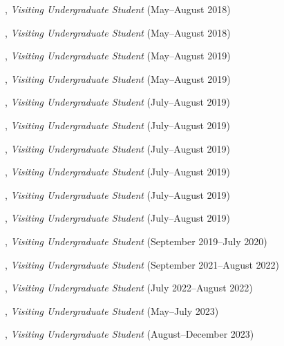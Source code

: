 \documentclass[10pt]{article}
\newenvironment{myindentpar}[1]%
{\begin{list}{}%
         {\setlength{\leftmargin}{#1}}%
         \item[]%
}
{\end{list}}
\newcounter{list}
\begin{document}
\begin{myindentpar}{0.75cm}
\hspace{-0.75cm}{\bf Wenhao Yu}, \textit{Visiting Undergraduate Student} (May--August 2018)

\hspace{-0.75cm}{\bf Ms. Yu Shu}, \textit{Visiting Undergraduate Student} (May--August 2018)

\hspace{-0.75cm}{\bf Chuchen Deng}, \textit{Visiting Undergraduate Student} (May--August 2019)

\hspace{-0.75cm}{\bf Yihong Ma}, \textit{Visiting Undergraduate Student} (May--August 2019)

\hspace{-0.75cm}{\bf Xin Liu}, \textit{Visiting Undergraduate Student} (July--August 2019)

\hspace{-0.75cm}{\bf Wei Peng}, \textit{Visiting Undergraduate Student} (July--August 2019)

\hspace{-0.75cm}{\bf Ms. Mengxia Yu}, \textit{Visiting Undergraduate Student} (July--August 2019)

\hspace{-0.75cm}{\bf Ms. Kaifeng Yu}, \textit{Visiting Undergraduate Student} (July--August 2019)

\hspace{-0.75cm}{\bf Zhihan Zhang}, \textit{Visiting Undergraduate Student} (July--August 2019)

\hspace{-0.75cm}{\bf Ms. Yang Zhou}, \textit{Visiting Undergraduate Student} (July--August 2019)

\hspace{-0.75cm}{\bf Zaitang Li}, \textit{Visiting Undergraduate Student} (September 2019--July 2020)

\hspace{-0.75cm}{\bf Yunxiang Yan}, \textit{Visiting Undergraduate Student} (September 2021--August 2022)

\hspace{-0.75cm}{\bf Qi Liu}, \textit{Visiting Undergraduate Student} (July 2022--August 2022)

\hspace{-0.75cm}{\bf Kairui Hu}, \textit{Visiting Undergraduate Student} (May--July 2023)

\hspace{-0.75cm}{\bf Yuxuan Kuang}, \textit{Visiting Undergraduate Student} (August--December 2023)


\end{myindentpar}
\end{document}
